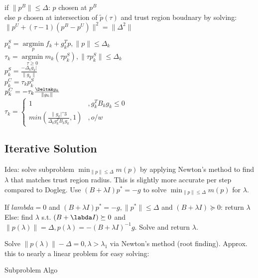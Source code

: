 \documentclass[8pt,letter]{article}
\DeclareMathOperator*{\argmin}{argmin}
\newcommand*{\argminl}{\argmin\limits}
\begin{document}
\begin{multicols*}{2}
  if $\|p^B\| \leq \Delta$: $p$ chosen at $p^B$\\
  else $p$ chosen at intersection of $\tilde{p}(\tau)$ and trust region boudnary by solving:\\
  $\|p^U+(\tau-1)(p^B-p^U)\|^2 = \|\Delta^2\|$

  $p_k^S=\argminl_p f_k+g_k^Tp, \|p\| \leq \Delta_k$\\
  $\tau_k = \argminl_{\tau\geq0} m_k(\tau p_k^S), \|\tau p_k^S\| \leq \Delta_k$\\
  $p_k^S=\frac{-\Delta_k g_k|}{\|g_k\|}$\\
  $p_k^C=\tau_k p_k^S$\\
  $p_k^C=-\tau_k \frac{\Deltak g_k}{\|g_k\|}$\\
  $\tau_k=\begin{cases}
    1 &, g_k^T B_k g_k \leq 0\\
    min(\frac{\|g_k|\^3}{\Delta_k g_k^T B_k g_k}, 1) &, o/w
  \end{cases}$
  
  \vfill\null
  \pagebreak

  \subsection{Iterative Solution}
  Idea: solve subproblem $\min_{\|p\| \leq \Delta} m(p)$ by applying Newton's method to find $\lambda$ that matches trust region radius. This is slightly more accurate per step compared to Dogleg. Use $(B+\lambda I)p^*=-g$ to solve $\min_{\|p\| \leq \Delta} m(p)$ for $\lambda$.

  If $lambda=0$ and $(B+\lambda I)p^*=-g, \|p^*\| \leq \Delta$ and $(B+\lambda I) \succeq 0$: return $\lambda$\\
  Else: find $\lambda$ s.t. $(B+\labda I) \succeq 0$ and $\|p(\lambda)\| = \Delta, p(\lambda)=-(B+\lambda I)^{-1}g$. Solve and return $\lambda$.
  
  Solve $\|p(\lambda)\|-\Delta=0, \lambda > \lambda_1$ via Newton's method (root finding). Approx. this to nearly a linear problem for easy solving:\\

  \begin{algorithm}[H]
    \caption{Subproblem Algo\label{Algo_TrustRegionIterativeSubproblem}}
  \end{algorithm}


\end{multicols*}
\end{document}
